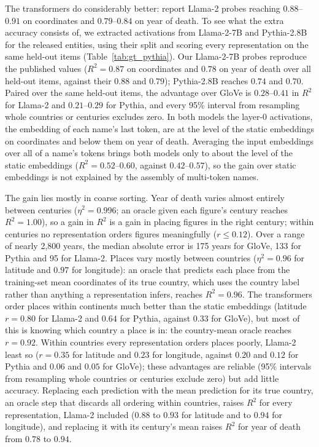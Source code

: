 \documentclass[11pt]{article}
\begin{document}
The transformers do considerably better: \citet{gurnee2024language} report Llama-2 probes
reaching $0.88$--$0.91$ on coordinates and $0.79$--$0.84$ on year of death. To see what the
extra accuracy consists of, we extracted activations from Llama-2-7B and Pythia-2.8B for
the released entities, using their split and scoring every representation on the same
held-out items (Table~\ref{tab:gt_pythia}). Our Llama-2-7B probes reproduce the published
values ($R^2 = 0.87$ on coordinates and $0.78$ on year of death over all held-out items,
against their $0.88$ and $0.79$); Pythia-2.8B reaches $0.74$ and $0.70$. Paired over the
same held-out items, the advantage over GloVe is $0.28$--$0.41$ in $R^2$ for Llama-2 and
$0.21$--$0.29$ for Pythia, and every 95\% interval from resampling whole countries or centuries
excludes zero. In both models the
layer-0 activations, the embedding of each name's last token, are at the level of the static
embeddings on coordinates and below them on year of death. Averaging the input embeddings
over all of a name's tokens brings both models only to about the
level of the static embeddings ($R^2 = 0.52$--$0.60$, against $0.42$--$0.57$), so the gain over static embeddings is
not explained by the assembly of multi-token names.

The gain lies mostly in coarse sorting. Year of death varies almost entirely between centuries ($\eta^2 = 0.996$; an oracle given each figure's century reaches $R^2 = 1.00$), so a gain in $R^2$ is a gain in placing figures in the right century; within centuries no representation orders figures meaningfully ($r \leq 0.12$). Over a range of nearly 2{,}800 years, the median absolute error is 175 years for GloVe, 133 for Pythia and 95 for Llama-2. Places vary mostly between countries ($\eta^2 = 0.96$ for latitude and $0.97$ for longitude): an oracle that predicts each place from the training-set mean coordinates of its true country, which uses the country label rather than anything a representation infers, reaches $R^2 = 0.96$. The transformers order places within continents much better than the static embeddings (latitude $r = 0.80$ for Llama-2 and $0.64$ for Pythia, against $0.33$ for GloVe), but most of this is knowing which country a place is in: the country-mean oracle reaches $r = 0.92$. Within countries every representation orders places poorly, Llama-2 least so ($r = 0.35$ for latitude and $0.23$ for longitude, against $0.20$ and $0.12$ for Pythia and $0.06$ and $0.05$ for GloVe); these advantages are reliable (95\% intervals from resampling whole countries or centuries exclude zero) but add little accuracy. Replacing each prediction with the mean prediction for its true country, an oracle step that discards all ordering within countries, raises $R^2$ for every representation, Llama-2 included ($0.88$ to $0.93$ for latitude and to $0.94$ for longitude), and replacing it with its century's mean raises $R^2$ for year of death from $0.78$ to $0.94$.
\end{document}
